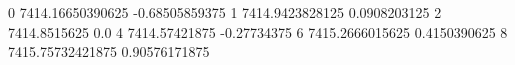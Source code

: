 0 7414.16650390625 -0.68505859375
1 7414.9423828125 0.0908203125
2 7414.8515625 0.0
4 7414.57421875 -0.27734375
6 7415.2666015625 0.4150390625
8 7415.75732421875 0.90576171875
